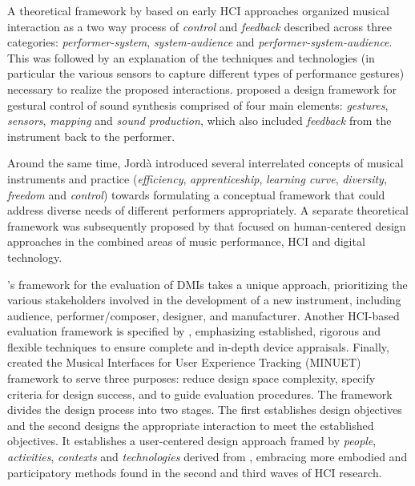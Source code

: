\documentclass[Sullivan_phd_thesis.tex]{subfiles}
\begin{document}
A theoretical framework by \textcite{Bongers2000a} based on early HCI approaches organized musical interaction as a two way process of \emph{control} and \emph{feedback} described across three categories: \emph{performer-system}, \emph{system-audience} and \emph{performer-system-audience}. This was followed by an explanation of the techniques and technologies (in particular the various sensors to capture different types of performance gestures) necessary to realize the proposed interactions. \textcite{Wanderley2004} proposed a design framework for gestural control of sound synthesis comprised of four main elements: \emph{gestures}, \emph{sensors}, \emph{mapping} and \emph{sound production}, which also included \emph{feedback} from the instrument back to the performer. 

Around the same time, Jordà \parencite*{Jorda2004, Jorda2004b} introduced several interrelated concepts of musical instruments and practice (\emph{efficiency}, \emph{apprenticeship}, \emph{learning curve}, \emph{diversity}, \emph{freedom} and \emph{control}) towards formulating a conceptual framework that could address diverse needs of different performers appropriately. A separate theoretical framework was subsequently proposed by \textcite{Overholt2009} that focused on human-centered design approaches in the combined areas of music performance, HCI and digital technology.

\citeauthor{OModhrain2011a}'s framework for the evaluation of DMIs \parencite*{OModhrain2011a} takes a unique approach, prioritizing the various stakeholders involved in the development of a new instrument, including audience, performer/composer, designer, and manufacturer. Another HCI-based evaluation framework is specified by \textcite{Young2015a}, emphasizing established, rigorous and flexible techniques to ensure complete and in-depth device appraisals. Finally, \textcite{fmorreale:2014} created the Musical Interfaces for User Experience Tracking (MINUET) framework to serve three purposes: reduce design space complexity, specify criteria for design success, and to guide evaluation procedures. The framework divides the design process into two stages. The first establishes design objectives and the second designs the appropriate interaction to meet the established objectives. It establishes a user-centered design approach framed by \emph{people}, \emph{activities}, \emph{contexts} and \emph{technologies} derived from \textcite{Benyon2005}, embracing more embodied and participatory methods found in the second and third waves of HCI research.
\end{document}
